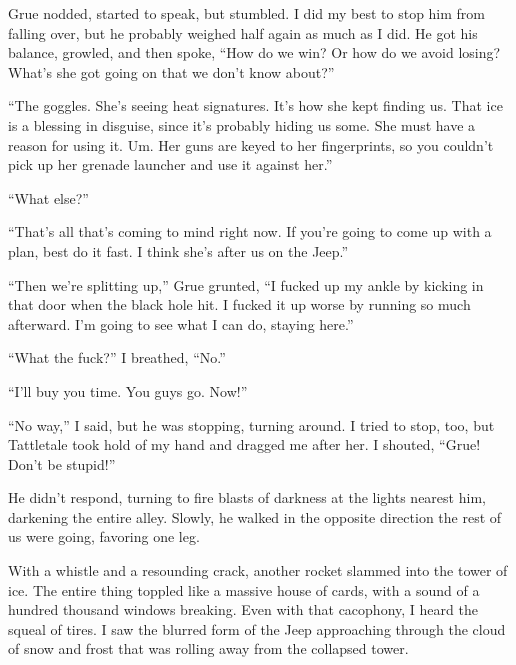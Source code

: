 Grue nodded, started to speak, but stumbled.  I did my best to stop him from falling over, but he probably weighed half again as much as I did.  He got his balance, growled, and then spoke, ``How do we win?  Or how do we avoid losing?  What's she got going on that we don't know about?''



``The goggles.  She's seeing heat signatures.  It's how she kept finding us.  That ice is a blessing in disguise, since it's probably hiding us some.  She must have a reason for using it.  Um.  Her guns are keyed to her fingerprints, so you couldn't pick up her grenade launcher and use it against her.''



``What else?''



``That's all that's coming to mind right now.  If you're going to come up with a plan, best do it fast.  I think she's after us on the Jeep.''



``Then we're splitting up,'' Grue grunted, ``I fucked up my ankle by kicking in that door when the black hole hit.  I fucked it up worse by running so much afterward.  I'm going to see what I can do, staying here.''



``What the fuck?'' I breathed, ``No.''



``I'll buy you time.  You guys go.  Now!''



``No way,'' I said, but he was stopping, turning around.  I tried to stop, too, but Tattletale took hold of my hand and dragged me after her.  I shouted, ``Grue!  Don't be stupid!''



He didn't respond, turning to fire blasts of darkness at the lights nearest him, darkening the entire alley.  Slowly, he walked in the opposite direction the rest of us were going, favoring one leg.



With a whistle and a resounding crack, another rocket slammed into the tower of ice.  The entire thing toppled like a massive house of cards, with a sound of a hundred thousand windows breaking.  Even with that cacophony, I heard the squeal of tires.  I saw the blurred form of the Jeep approaching through the cloud of snow and frost that was rolling away from the collapsed tower.




